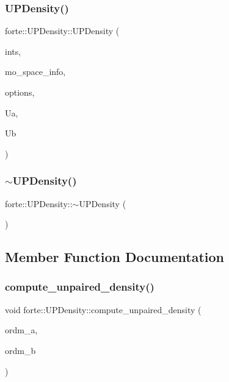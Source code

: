 \subsubsection{\texorpdfstring{U\+P\+Density()}{UPDensity()}}
{\footnotesize\ttfamily forte\+::\+U\+P\+Density\+::\+U\+P\+Density (\begin{DoxyParamCaption}\item[{std\+::shared\+\_\+ptr$<$ \mbox{\hyperlink{classforte_1_1_forte_integrals}{Forte\+Integrals}} $>$}]{ints,  }\item[{std\+::shared\+\_\+ptr$<$ \mbox{\hyperlink{classforte_1_1_m_o_space_info}{M\+O\+Space\+Info}} $>$}]{mo\+\_\+space\+\_\+info,  }\item[{std\+::shared\+\_\+ptr$<$ \mbox{\hyperlink{classforte_1_1_forte_options}{Forte\+Options}} $>$}]{options,  }\item[{psi\+::\+Shared\+Matrix}]{Ua,  }\item[{psi\+::\+Shared\+Matrix}]{Ub }\end{DoxyParamCaption})}

\mbox{\label{classforte_1_1_u_p_density_aa445f31bf03a2d761b47a83433b4cc1f}} 
\subsubsection{\texorpdfstring{$\sim$\+U\+P\+Density()}{~UPDensity()}}
{\footnotesize\ttfamily forte\+::\+U\+P\+Density\+::$\sim$\+U\+P\+Density (\begin{DoxyParamCaption}{ }\end{DoxyParamCaption})}



\subsection{Member Function Documentation}
\mbox{\label{classforte_1_1_u_p_density_abe949d4aaca67fd3f46123cc0edfb04f}} 
\subsubsection{\texorpdfstring{compute\+\_\+unpaired\+\_\+density()}{compute\_unpaired\_density()}}
{\footnotesize\ttfamily void forte\+::\+U\+P\+Density\+::compute\+\_\+unpaired\+\_\+density (\begin{DoxyParamCaption}\item[{std\+::vector$<$ double $>$ \&}]{ordm\+\_\+a,  }\item[{std\+::vector$<$ double $>$ \&}]{ordm\+\_\+b }\end{DoxyParamCaption})}

